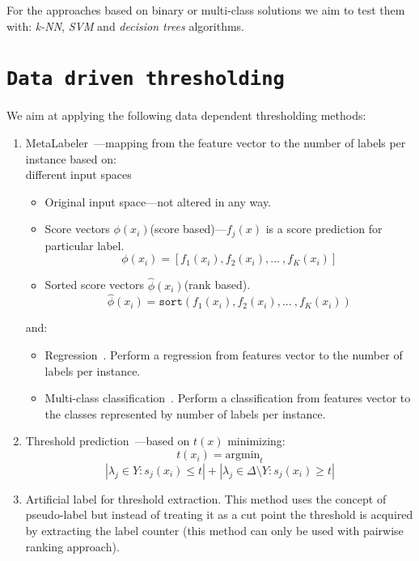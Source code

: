 \documentclass[12pt,a4paper,twocolumn]{article}
\newcommand{\ts}{\textsuperscript}
\begin{document}
For the approaches based on binary or multi-class solutions we aim to test them with: \emph{k-NN}, \emph{SVM} and \emph{decision trees} algorithms.

\section*{\texttt{Data driven thresholding}}
We aim at applying the following data dependent thresholding methods:


\begin{enumerate}
\item MetaLabeler~\cite{Tang:2009:LSM:1526709.1526738}---mapping from the feature vector to the number of labels per instance based on:\\

	different input spaces
	\begin{itemize} %
	\item Original input space---not altered in any way.
	\item Score vectors $\phi(x_i)$(score based)---$f_j(x)$ is a score prediction for particular label.
	$$
	\phi(x_i) = [ f_1(x_i), f_2(x_i), ...\ , f_K(x_i) ]
	$$
	\item Sorted score vectors $\hat{\phi}(x_i)$(rank based).
	$$
	\hat{\phi}(x_i) = \texttt{sort} ( f_1(x_i), f_2(x_i), ...\ , f_K(x_i) )
	$$
	\end{itemize}

	and:
	\begin{itemize} %
	\item Regression~\cite{conf/ictai/IoannouSTV10}. Perform a regression from features vector to the number of labels per instance.
	\item Multi-class classification~\cite{conf/ictai/IoannouSTV10}. Perform a classification from features vector to the classes represented by number of labels per instance.
	\end{itemize}

\item Threshold prediction~\cite{Elisseeff01akernel}---based on $t(x)$ minimizing:
	$$
	t(x_i) = \text{argmin}_t $$ $$ | \lambda_j \in Y : s_j(x_i) \leq t | + | \lambda_j \in \Delta \text{\textbackslash{}} Y : s_j(x_i) \geq t |
	$$

\item Artificial label for threshold extraction. This method uses the concept of pseudo-label but instead of treating it as a cut point the threshold is acquired by extracting the label counter (this method can only be used with pairwise ranking approach).%


\end{enumerate}
\end{document}

